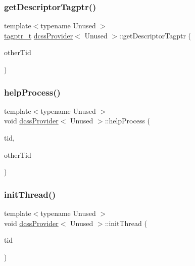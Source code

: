 \subsubsection{\texorpdfstring{get\+Descriptor\+Tagptr()}{getDescriptorTagptr()}}
{\footnotesize\ttfamily template$<$typename Unused $>$ \\
\hyperlink{descriptors_8h_afd8a7b57046ed96897cda907f17737a7}{tagptr\+\_\+t} \hyperlink{classdcssProvider}{dcss\+Provider}$<$ Unused $>$\+::get\+Descriptor\+Tagptr (\begin{DoxyParamCaption}\item[{const int}]{other\+Tid }\end{DoxyParamCaption})\hspace{0.3cm}{\ttfamily [inline]}}

\mbox{\label{classdcssProvider_ab00e94953c5a037f32896970e5b42c51}} 
\subsubsection{\texorpdfstring{help\+Process()}{helpProcess()}}
{\footnotesize\ttfamily template$<$typename Unused $>$ \\
void \hyperlink{classdcssProvider}{dcss\+Provider}$<$ Unused $>$\+::help\+Process (\begin{DoxyParamCaption}\item[{const int}]{tid,  }\item[{const int}]{other\+Tid }\end{DoxyParamCaption})\hspace{0.3cm}{\ttfamily [inline]}}

\mbox{\label{classdcssProvider_a63c5a578a6805f375beb4e76e8a96ef3}} 
\subsubsection{\texorpdfstring{init\+Thread()}{initThread()}}
{\footnotesize\ttfamily template$<$typename Unused $>$ \\
void \hyperlink{classdcssProvider}{dcss\+Provider}$<$ Unused $>$\+::init\+Thread (\begin{DoxyParamCaption}\item[{const int}]{tid }\end{DoxyParamCaption})}

